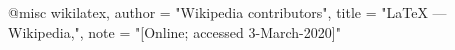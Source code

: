 @misc{ wikilatex,
		author = "{Wikipedia contributors}",
		title = "LaTeX --- {Wikipedia}{,}",
		note = "[Online; accessed 3-March-2020]"
	}
